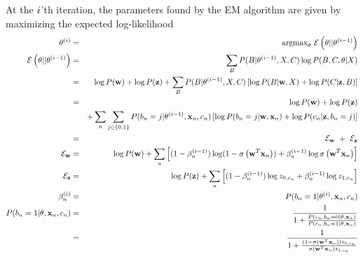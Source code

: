 \documentclass{article}
\begin{document}
At the $i$'th iteration, the parameters found by the EM algorithm are given by maximizing the expected log-likelihood
\begin{eqnarray*}
  \emparams^{(\emiteration)}
  & = &
  \argmax_{\emparams}\ 
  \emobjective\left(\emparams||\emparams^{(\emiteration-1)}\right)
  \\
  \emobjective\left(\emparams||\emparams^{(\emiteration-1)}\right)
  & = & 
  \sum_{\missing} P(\missing | \emparams^{(\emiteration-1)}, \allrealdata, \allcatlabels) \log P(\missing,\allcatlabels,\emparams|\allrealdata)
  \\
  & = & 
  \log P(\weights) + \log P(\labelerrprobs)
  + \sum_{\missing} P(\missing | \emparams^{(\emiteration-1)}, \allrealdata, \allcatlabels) \left[ \log P(\missing| \weights, \allrealdata) + \log P(\allcatlabels|\labelerrprobs,\missing) \right]
  \\
  & = & 
  \log P(\weights) + \log P(\labelerrprobs)
  \\ & &
  + \sum_{\datapoint} \sum_{\binlabelindex \in \{0,1\}} P(\binlabel_{\datapoint} = \binlabelindex | \emparams^{(\emiteration-1)}, \realdata_{\datapoint}, \catlabel_{\datapoint}) \left[ \log P(\binlabel_{\datapoint} = \binlabelindex | \weights, \realdata_{\datapoint}) + \log P(\catlabel_{\datapoint}|\labelerrprobs,\binlabel_{\datapoint}=\binlabelindex) \right]
  \\ & = &
  \emobjective_{\weights}\ +\ \emobjective_{\labelerrprobs}
  \\
  \emobjective_{\weights}
  & = &
  \log P(\weights)
  + \sum_{\datapoint} \left[ (1-\prevpostprob) \log (1 - \logistic{\transpose{\weights} \realdata_{\datapoint}})
  + \prevpostprob \log \logistic{\transpose{\weights} \realdata_{\datapoint}} \right]
  \\
  \emobjective_{\labelerrprobs}
  & = &
  \log P(\labelerrprobs)
  + \sum_{\datapoint} \left[ (1-\prevpostprob) \log \labelerrprob_{0,\catlabel_{\datapoint}} + \prevpostprob \log \labelerrprob_{1,\catlabel_{\datapoint}} \right]
  \\
  \postprob{\emiteration}
  & = &
  P(\binlabel_{\datapoint} = 1 | \emparams^{(\emiteration)}, \realdata_{\datapoint}, \catlabel_{\datapoint})
  \\
  P(\binlabel_{\datapoint} = 1 | \emparams, \realdata_{\datapoint}, \catlabel_{\datapoint})
  & = &
  \frac{1}{1 + \frac{P(\catlabel_{\datapoint}, \binlabel_{\datapoint} = 0 | \emparams, \realdata_{\datapoint})}
    {P(\catlabel_{\datapoint}, \binlabel_{\datapoint} = 1 | \emparams, \realdata_{\datapoint})}}
  \\
  & = &
  \frac{1}{1 + \frac{(1 - \logistic{\transpose{\weights} \realdata_{\datapoint}}) \labelerrprob_{0,\catlabel_{\datapoint}}}
    {\logistic{\transpose{\weights} \realdata_{\datapoint}} \labelerrprob_{1,\catlabel_{\datapoint}}}}
\end{eqnarray*}
\end{document}
